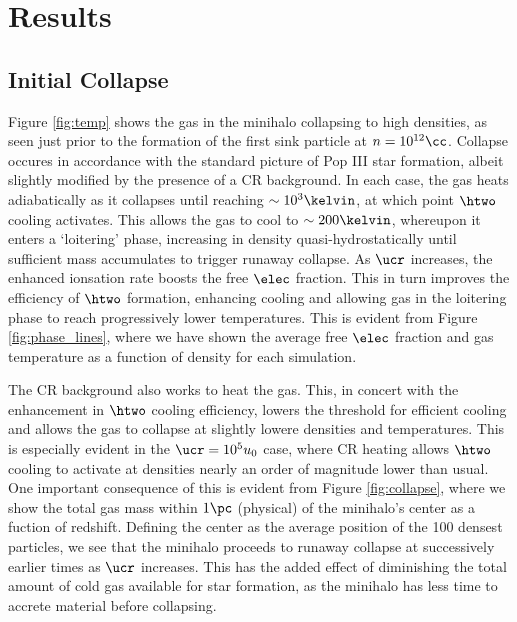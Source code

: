\section{Results}
\label{sec:results}
\subsection{Initial Collapse}
\label{sec:initial_collapse}

Figure \ref{fig:temp} shows the gas in the minihalo collapsing to high densities, as seen just prior to the formation of the first sink particle at $n=10^{12}\cc$.  Collapse occures in accordance with the standard picture of Pop III star formation, albeit slightly modified by the presence of a CR background.  In each case, the gas heats adiabatically as it collapses until reaching $\sim10^3\kelvin$, at which point $\htwo$ cooling activates.  This allows the gas to cool to $\sim200\kelvin$, whereupon it enters a `loitering' phase, increasing in density quasi-hydrostatically until sufficient mass accumulates to trigger runaway collapse.  As $\ucr$ increases, the enhanced ionsation rate boosts the free $\elec$ fraction.  This in turn improves the efficiency of $\htwo$ formation, enhancing cooling and allowing gas in the loitering phase to reach progressively lower temperatures.  This is evident from Figure \ref{fig:phase_lines}, where we have shown the average free $\elec$ fraction and gas temperature as a function of density for each simulation.

The CR background also works to heat the gas.  This, in concert with the enhancement in $\htwo$ cooling efficiency, lowers the threshold for efficient cooling and allows the gas to collapse at slightly lowere densities and temperatures.  This is especially evident in the $\ucr = 10^5 u_0$ case, where CR heating allows $\htwo$ cooling to activate at densities nearly an order of magnitude lower than usual.  One important consequence of this is evident from Figure \ref{fig:collapse}, where we show the total gas mass within $1\pc$ (physical) of the minihalo's center as a fuction of redshift.  Defining the center as the average position of the 100 densest particles, we see that the minihalo proceeds to runaway collapse at successively earlier times as $\ucr$ increases.  This has the added effect of diminishing the total amount of cold gas available for star formation, as the minihalo has less time to accrete material before collapsing.
